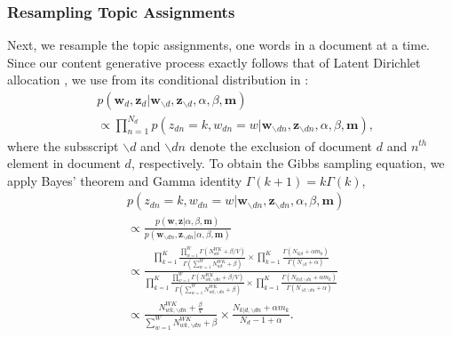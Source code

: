 \documentclass[twoside]{article}
\begin{document}
  	  \subsubsection{Resampling Topic Assignments}  \label{subsubsec: Resampling Z}
Next, we resample the topic assignments, one words in a document at a time. Since our content generative process exactly follows that of Latent Dirichlet allocation \citep{Blei2003}, we use 
 \iffalse from its conditional distribution in :
  	  \begin{equation*}
  	  \begin{aligned}
  	  & p(\boldsymbol{w}_{d}, \boldsymbol{z}_{d}|\boldsymbol{w}_{\backslash d}, \boldsymbol{z}_{\backslash d},\alpha,  \beta, \boldsymbol{m}) \\& \propto \prod_{n=1}^{{N_d}}p(z_{dn}=k, w_{dn}=w| \boldsymbol{w}_{\backslash dn}, \boldsymbol{z}_{\backslash dn},\alpha,  \beta, \boldsymbol{m}),
  	  \end{aligned}
  	  \end{equation*}
  	  where the subsscript $\backslash d$ and $\backslash dn$ denote the exclusion of document $d$ and $n^{th}$ element in document $d$, respectively.  
  	  To obtain the Gibbs sampling equation, we apply Bayes' theorem and Gamma identity $\Gamma(k+1)=k\Gamma(k)$,
  	  \begin{equation*}
  	  \begin{aligned}
  	  & p(z_{dn}=k, w_{dn}=w| \boldsymbol{w}_{\backslash dn}, \boldsymbol{z}_{\backslash dn},\alpha,  \beta, \boldsymbol{m})\\& \propto 
  	  \frac{p(\boldsymbol{w},\boldsymbol{z}|\alpha, \beta, \boldsymbol{m})}{p(\boldsymbol{w}_{\backslash dn}, \boldsymbol{z}_{\backslash dn}|\alpha, \beta, \boldsymbol{m})}\\& \propto \frac{\prod_{k=1}^{K}\frac{\prod_{w=1}^W\Gamma(N_{wk}^{WK}+\beta/V)}{\Gamma(\sum_{w=1}^WN_{wk}^{WK}+\beta )}\times\prod_{k=1}^K\frac{\Gamma(N_{k|d}+\alpha m_k)}{\Gamma(N_{\cdot|d}+\alpha)}}{\prod_{k=1}^{K}\frac{\prod_{w=1}^W\Gamma(N_{wk, \backslash dn}^{WK}+\beta/V)}{\Gamma(\sum_{w=1}^WN_{wk, \backslash dn}^{WK}+\beta )}\times\prod_{k=1}^K\frac{\Gamma(N_{k|d, \backslash dn}+\alpha m_k)}{\Gamma(N_{\cdot|d, \backslash dn}+\alpha)}}\\ & \propto 
  	  \frac{N_{wk, \backslash dn}^{WK}+\frac{\beta}{V}}{\sum_{w=1}^WN_{wk,  \backslash dn}^{WK}+\beta}\times\frac{N_{k|d, \backslash dn}+\alpha m_k}{N_d-1+\alpha}.
  	  \end{aligned}
  	  \end{equation*}
\end{document}
